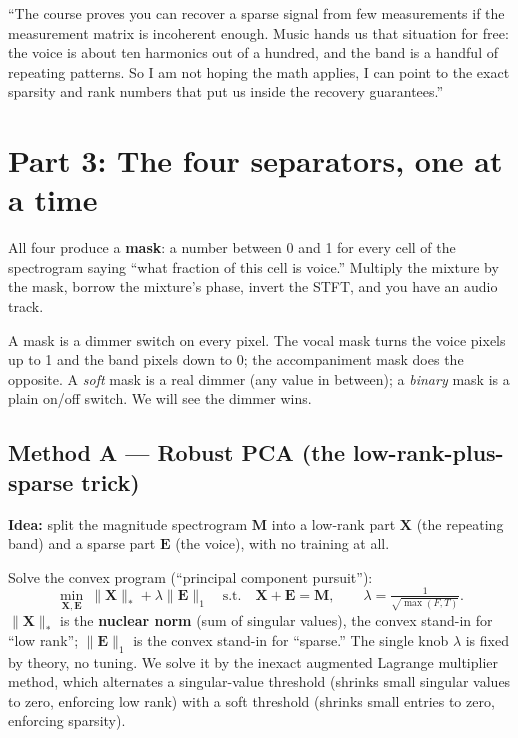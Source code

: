 \documentclass[11pt]{article}
\newcommand{\norm}[1]{\lVert#1\rVert}
\begin{document}
\begin{saythis}
``The course proves you can recover a sparse signal from few measurements if the
measurement matrix is incoherent enough. Music hands us that situation for free:
the voice is about ten harmonics out of a hundred, and the band is a handful of
repeating patterns. So I am not hoping the math applies, I can point to the exact
sparsity and rank numbers that put us inside the recovery guarantees.''
\end{saythis}

\section{Part 3: The four separators, one at a time}

All four produce a \textbf{mask}: a number between 0 and 1 for every cell of the
spectrogram saying ``what fraction of this cell is voice.'' Multiply the mixture by
the mask, borrow the mixture's phase, invert the STFT, and you have an audio track.

\begin{analogy}
A mask is a dimmer switch on every pixel. The vocal mask turns the voice pixels up
to 1 and the band pixels down to 0; the accompaniment mask does the opposite. A
\emph{soft} mask is a real dimmer (any value in between); a \emph{binary} mask is a
plain on/off switch. We will see the dimmer wins.
\end{analogy}

\subsection{Method A --- Robust PCA (the low-rank-plus-sparse trick)}
\textbf{Idea:} split the magnitude spectrogram $\bm M$ into a low-rank part $\bm X$
(the repeating band) and a sparse part $\bm E$ (the voice), with no training at all.

\begin{slowmath}
Solve the convex program (``principal component pursuit''):
\[
\min_{\bm X,\bm E}\ \norm{\bm X}_*+\lambda\norm{\bm E}_1
\quad\text{s.t.}\quad \bm X+\bm E=\bm M,\qquad \lambda=\tfrac1{\sqrt{\max(F,T)}}.
\]
$\norm{\bm X}_*$ is the \textbf{nuclear norm} (sum of singular values), the convex
stand-in for ``low rank''; $\norm{\bm E}_1$ is the convex stand-in for ``sparse.''
The single knob $\lambda$ is fixed by theory, no tuning. We solve it by the inexact
augmented Lagrange multiplier method, which alternates a singular-value threshold
(shrinks small singular values to zero, enforcing low rank) with a soft threshold
(shrinks small entries to zero, enforcing sparsity).
\end{slowmath}
\end{document}
